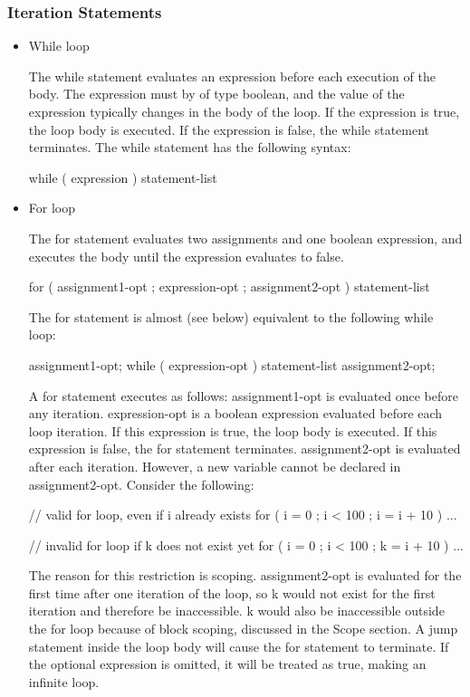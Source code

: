 \documentclass[oneside]{book}
\begin{document}
\subsubsection{Iteration Statements}
\begin{itemize}

\item While loop

The while statement evaluates an expression before each execution of the body. The expression must by of type boolean, and the value of the expression typically changes in the body of the loop. If the expression is true, the loop body is executed. If the expression is false, the while statement terminates. The while statement has the following syntax:

\begin{code}
while ( expression )
{
  statement-list
}
\end{code}

\item For loop

The for statement evaluates two assignments and one boolean expression, and executes the body until the expression evaluates to false.

\begin{code}
for ( assignment1-opt ; expression-opt ; assignment2-opt ) 
{
  statement-list
}
\end{code}

The for statement is almost (see below) equivalent to the following while loop:

\begin{code}
assignment1-opt;
while ( expression-opt )
{
  statement-list
  assignment2-opt;
}
\end{code}

A for statement executes as follows:
assignment1-opt is evaluated once before any iteration. expression-opt is a boolean expression evaluated before each loop iteration. If this expression is true, the loop body is executed. If this expression is false, the for statement terminates. assignment2-opt is evaluated after each iteration. However, a new variable cannot be declared in assignment2-opt. Consider the following:
\begin{mdframed}
[hidealllines=true,backgroundcolor=gray!10,skipbelow=.5em,skipabove=.5em]
\begin{code}
// valid for loop, even if i already exists
for ( i = 0 ; i < 100 ; i = i + 10 ) 
{
  ...
}

// invalid for loop if k does not exist yet
for ( i = 0 ; i < 100 ; k = i + 10 )
{
  ...
}
\end{code}
\end{mdframed}
The reason for this restriction is scoping. assignment2-opt is evaluated for the first time after one iteration of the loop, so k would not exist for the first iteration and therefore be inaccessible. k would also be inaccessible outside the for loop because of block scoping, discussed in the Scope section. A jump statement inside the loop body will cause the for statement to terminate. If the optional expression is omitted, it will be treated as true, making an infinite loop.
\end{itemize}      
\end{document}
